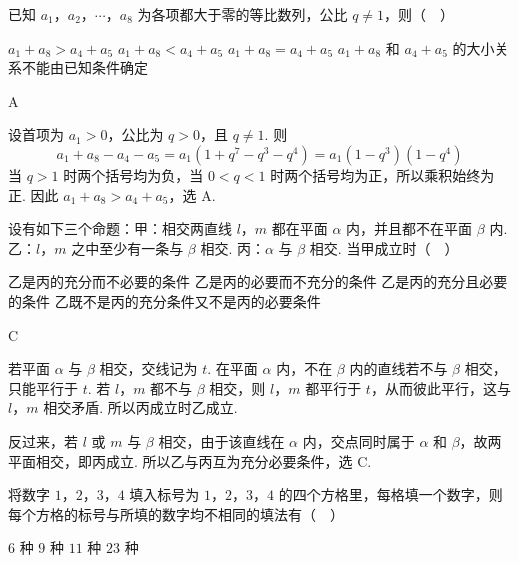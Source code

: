 \documentclass[UTF8,a4paper,oneside,11pt]{ctexbook}
\begin{document}
\begin{problem}
已知 \(a_1\)，\(a_2\)，\(\cdots\)，\(a_8\) 为各项都大于零的等比数列，公比 \(q\neq 1\)，则（\(\quad\)）

\choices
    {\(a_1+a_8>a_4+a_5\)}
    {\(a_1+a_8<a_4+a_5\)}
    {\(a_1+a_8=a_4+a_5\)}
    {\(a_1+a_8\) 和 \(a_4+a_5\) 的大小关系不能由已知条件确定}
\end{problem}

\begin{answer}
A
\end{answer}

\begin{solution}
设首项为 \(a_1>0\)，公比为 \(q>0\)，且 \(q\neq1\). 则
\[
a_1+a_8-a_4-a_5
=a_1(1+q^7-q^3-q^4)
=a_1(1-q^3)(1-q^4)
\]
当 \(q>1\) 时两个括号均为负，当 \(0<q<1\) 时两个括号均为正，所以乘积始终为正. 因此 \(a_1+a_8>a_4+a_5\)，选 A.
\end{solution}

\begin{problem}
设有如下三个命题：甲：相交两直线 \(l\)，\(m\) 都在平面 \(\alpha\) 内，并且都不在平面 \(\beta\) 内. 乙：\(l\)，\(m\) 之中至少有一条与 \(\beta\) 相交. 丙：\(\alpha\) 与 \(\beta\) 相交. 当甲成立时（\(\quad\)）

\choices
    {乙是丙的充分而不必要的条件}
    {乙是丙的必要而不充分的条件}
    {乙是丙的充分且必要的条件}
    {乙既不是丙的充分条件又不是丙的必要条件}
\end{problem}

\begin{answer}
C
\end{answer}

\begin{solution}
若平面 \(\alpha\) 与 \(\beta\) 相交，交线记为 \(t\). 在平面 \(\alpha\) 内，不在 \(\beta\) 内的直线若不与 \(\beta\) 相交，只能平行于 \(t\). 若 \(l\)，\(m\) 都不与 \(\beta\) 相交，则 \(l\)，\(m\) 都平行于 \(t\)，从而彼此平行，这与 \(l\)，\(m\) 相交矛盾. 所以丙成立时乙成立.

反过来，若 \(l\) 或 \(m\) 与 \(\beta\) 相交，由于该直线在 \(\alpha\) 内，交点同时属于 \(\alpha\) 和 \(\beta\)，故两平面相交，即丙成立. 所以乙与丙互为充分必要条件，选 C.
\end{solution}

\begin{problem}
将数字 \(1\)，\(2\)，\(3\)，\(4\) 填入标号为 \(1\)，\(2\)，\(3\)，\(4\) 的四个方格里，每格填一个数字，则每个方格的标号与所填的数字均不相同的填法有（\(\quad\)）

\choices
    {\(6\) 种}
    {\(9\) 种}
    {\(11\) 种}
    {\(23\) 种}
\end{problem}
\end{document}
